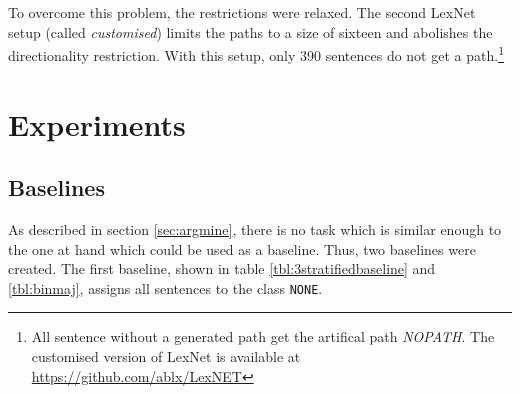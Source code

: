 To overcome this problem, the restrictions were relaxed. The second LexNet setup (called \emph{customised}) limits the paths to a size of sixteen and abolishes the directionality restriction. With this setup, only 390 sentences do not get a path.\footnote{All sentence without a generated path get the artifical path \emph{NOPATH}. The customised version of LexNet is available at \url{https://github.com/ablx/LexNET}}






\section{Experiments}
\subsection{Baselines}
\label{sec:3_baseline}
As described in section \ref{sec:argmine}, there is no task which is similar enough to the one at hand which could be used as a baseline. Thus, two baselines were created. The first baseline, shown in table \ref{tbl:3stratifiedbaseline} and \ref{tbl:binmaj}, assigns all sentences to the class \texttt{NONE}.


